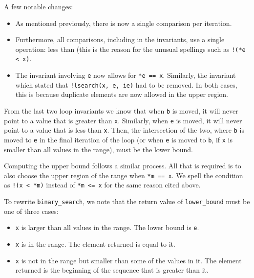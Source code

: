 A few notable changes:

\begin{itemize}
    \item
        As mentioned previously, there is now a single comparison per iteration.
    \item
        Furthermore, all comparisons, including in the invariants, use a single
        operation: less than (this is the reason for the unusual spellings such
        as \texttt{!(*e < x)}.
    \item
        The invariant involving \texttt{e} now allows for \texttt{*e == x}.
        Similarly, the invariant which stated that \texttt{!lsearch(x, e, ie)}
        had to be removed.  In both cases, this is because duplicate elements
        are now allowed in the upper region.
\end{itemize}

From the last two loop invariants we know that when \texttt{b} is moved, it will
never point to a value that is greater than \texttt{x}.  Similarly, when
\texttt{e} is moved, it will never point to a value that is less than
\texttt{x}.  Then, the intersection of the two, where \texttt{b} is moved to
\texttt{e} in the final iteration of the loop (or when \texttt{e} is moved to
\texttt{b}, if \texttt{x} is smaller than all values in the range), must be the
lower bound.

Computing the upper bound follows a similar process.  All that is required is to
also choose the upper region of the range when \texttt{*m == x}.  We spell
the condition as \texttt{!(x < *m)} instead of \texttt{*m <= x} for the same
reason cited above.



To rewrite \texttt{binary\_search}, we note that the return value of
\texttt{lower\_bound} must be one of three cases:

\begin{itemize}
    \item
        \texttt{x} is larger than all values in the range.  The lower bound is
        \texttt{e}.
    \item \texttt{x} is in the range.  The element returned is equal to it.
    \item
        \texttt{x} is not in the range but smaller than some of the values in
        it.  The element returned is the beginning of the sequence that is
        greater than it.
\end{itemize}

